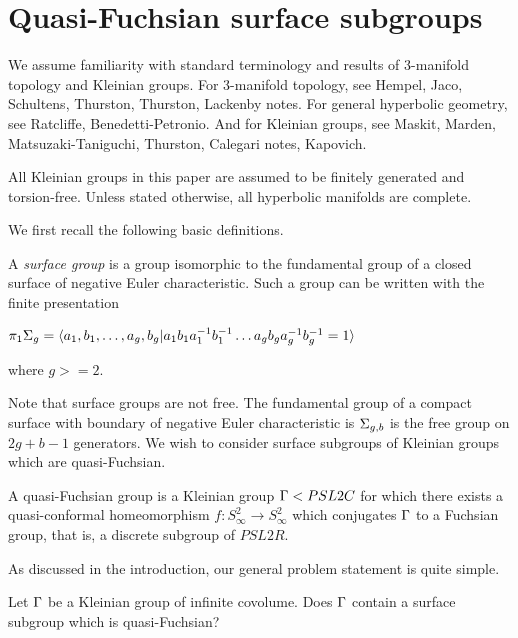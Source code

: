 \section{Quasi-Fuchsian surface subgroups}

We assume familiarity with standard terminology and results of 3-manifold
topology and Kleinian groups.  For 3-manifold topology, see Hempel, Jaco,
Schultens, Thurston, Thurston, Lackenby notes. For general hyperbolic geometry,
see Ratcliffe, Benedetti-Petronio. And for Kleinian groups, see Maskit, Marden,
Matsuzaki-Taniguchi, Thurston, Calegari notes, Kapovich.

All Kleinian groups in this paper are assumed to be finitely generated and
torsion-free. Unless stated otherwise, all hyperbolic manifolds are complete.

We first recall the following basic definitions.

\begin{defn}

A \emph{surface group} is a group isomorphic to the fundamental group of
a closed surface of negative Euler characteristic. Such a group can be written
with the finite presentation

$\pi_1 \Sigma_g = \langle a_1,b_1,\dots,a_g,b_g | a_1b_1a_1^{-1}b_1^{-1} \dots
a_gb_ga_g^{-1}b_g^{-1} = 1\rangle$

where $g >= 2$.

\end{defn}

Note that surface groups are not free. The fundamental group of a compact
surface with boundary of negative Euler characteristic is $\Sigma_{g,b}$ is the
free group on $2g + b - 1$ generators. We wish to consider surface subgroups of
Kleinian groups which are quasi-Fuchsian.

\begin{defn}

A {quasi-Fuchsian group} is a Kleinian group $\Gamma < PSL2C$ for which there
exists a quasi-conformal homeomorphism $f \colon S^2_\infty \to S^2_\infty$
which conjugates $\Gamma$ to a Fuchsian group, that is, a discrete subgroup of
$PSL2R$.

\end{defn}

As discussed in the introduction, our general problem statement is quite
simple.

\begin{prob}

Let $\Gamma$ be a Kleinian group of infinite covolume. Does $\Gamma$ contain
a surface subgroup which is quasi-Fuchsian?

\end{prob}

